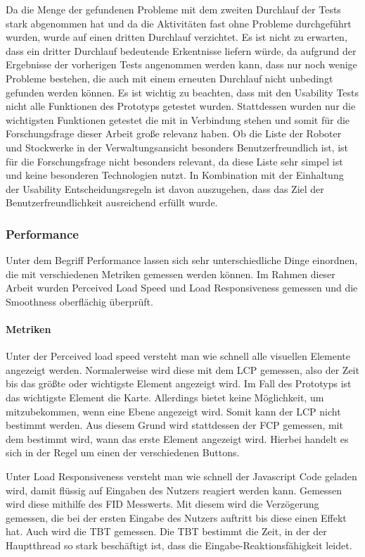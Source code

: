 Da die Menge der gefundenen Probleme mit dem zweiten Durchlauf der Tests stark abgenommen hat und da die Aktivitäten fast ohne Probleme durchgeführt wurden, wurde auf einen dritten Durchlauf verzichtet. Es ist nicht zu erwarten, dass ein dritter Durchlauf bedeutende Erkentnisse liefern würde, da aufgrund der Ergebnisse der vorherigen Tests angenommen werden kann, dass nur noch wenige Probleme bestehen, die auch mit einem erneuten Durchlauf nicht unbedingt gefunden werden können. Es ist wichtig zu beachten, dass mit den Usability Tests nicht alle Funktionen des Prototyps getestet wurden. Stattdessen wurden nur die wichtigsten Funktionen getestet die mit \deckgl{} in Verbindung stehen und somit für die Forschungsfrage dieser Arbeit große relevanz haben. Ob die Liste der Roboter und Stockwerke in der Verwaltungsansicht besonders Benutzerfreundlich ist, ist für die Forschungsfrage nicht besonders relevant, da diese Liste sehr simpel ist und keine besonderen Technologien nutzt. In Kombination mit der Einhaltung der Usability Entscheidungsregeln ist davon auszugehen, dass das Ziel der Benutzerfreundlichkeit ausreichend erfüllt wurde.

\subsubsection{Performance}
Unter dem Begriff Performance lassen sich sehr unterschiedliche Dinge einordnen, die mit verschiedenen Metriken gemessen werden können. Im Rahmen dieser Arbeit wurden Perceived Load Speed und Load Responsiveness gemessen und die Smoothness oberflächig überprüft.

\paragraph{Metriken}

Unter der Perceived load speed versteht man wie schnell alle visuellen Elemente angezeigt werden. Normalerweise wird diese mit dem \ac{LCP} gemessen, also der Zeit bis das größte oder wichtigste Element angezeigt wird. Im Fall des Prototyps ist das wichtigste Element die Karte. Allerdings bietet \deckgl{} keine Möglichkeit, um mitzubekommen, wenn eine Ebene angezeigt wird. Somit kann der \ac{LCP} nicht bestimmt werden. Aus diesem Grund wird stattdessen der \ac{FCP} gemessen, mit dem bestimmt wird, wann das erste Element angezeigt wird. Hierbei handelt es sich in der Regel um einen der verschiedenen Buttons.

Unter Load Responsiveness versteht man wie schnell der Javascript Code geladen wird, damit flüssig auf Eingaben des Nutzers reagiert werden kann. Gemessen wird diese mithilfe des \ac{FID} Messwerts. Mit diesem wird die Verzögerung gemessen, die bei der ersten Eingabe des Nutzers auftritt bis diese einen Effekt hat. Auch wird die \ac{TBT} gemessen. Die \ac{TBT} bestimmt die Zeit, in der der Hauptthread so stark beschäftigt ist, dass die Eingabe-Reaktionsfähigkeit leidet.

